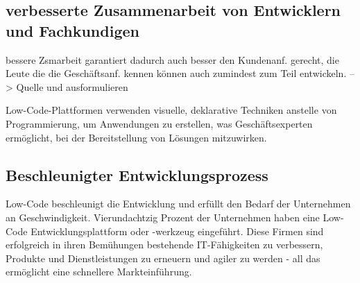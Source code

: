 \documentclass{article}
\begin{document}
	
	
	
	\subsection{verbesserte Zusammenarbeit von Entwicklern und Fachkundigen}
	bessere Zsmarbeit garantiert dadurch auch besser den Kundenanf. gerecht, die Leute die die Geschäftsanf. kennen können auch zumindest zum Teil entwickeln. --> Quelle und ausformulieren
	
	Low-Code-Plattformen verwenden visuelle, deklarative Techniken anstelle von
	Programmierung, um Anwendungen zu erstellen, was Geschäftsexperten ermöglicht, bei der
	Bereitstellung von Lösungen mitzuwirken. \cite{EmmaVanPelt.2019}
	
	
	\subsection{Beschleunigter Entwicklungsprozess}	
	Low-Code beschleunigt die Entwicklung und erfüllt den Bedarf der Unternehmen an Geschwindigkeit. Vierundachtzig Prozent der Unternehmen haben eine Low-Code Entwicklungsplattform oder -werkzeug eingeführt. Diese Firmen sind erfolgreich in ihren Bemühungen bestehende IT-Fähigkeiten zu verbessern, Produkte und Dienstleistungen zu erneuern und agiler zu werden - all das ermöglicht eine schnellere Markteinführung. \cite{EmmaVanPelt.2019}
	
\end{document}
